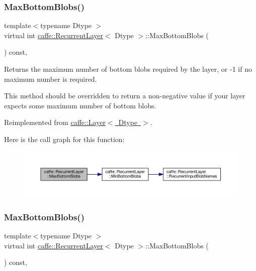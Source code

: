 \subsubsection{\texorpdfstring{Max\+Bottom\+Blobs()}{MaxBottomBlobs()}\hspace{0.1cm}{\footnotesize\ttfamily [1/2]}}
{\footnotesize\ttfamily template$<$typename Dtype $>$ \\
virtual int \mbox{\hyperlink{classcaffe_1_1_recurrent_layer}{caffe\+::\+Recurrent\+Layer}}$<$ Dtype $>$\+::Max\+Bottom\+Blobs (\begin{DoxyParamCaption}{ }\end{DoxyParamCaption}) const\hspace{0.3cm}{\ttfamily [inline]}, {\ttfamily [virtual]}}



Returns the maximum number of bottom blobs required by the layer, or -\/1 if no maximum number is required. 

This method should be overridden to return a non-\/negative value if your layer expects some maximum number of bottom blobs. 

Reimplemented from \mbox{\hyperlink{classcaffe_1_1_layer_af8bdc989053e0363ab032026b46de7c3}{caffe\+::\+Layer$<$ Dtype $>$}}.

Here is the call graph for this function\+:
\nopagebreak
\begin{figure}[H]
\begin{center}
\leavevmode
\includegraphics[width=350pt]{classcaffe_1_1_recurrent_layer_a983e1ead91884f9d2049a3000254961c_cgraph}
\end{center}
\end{figure}
\mbox{\label{classcaffe_1_1_recurrent_layer_a983e1ead91884f9d2049a3000254961c}} 
\subsubsection{\texorpdfstring{Max\+Bottom\+Blobs()}{MaxBottomBlobs()}\hspace{0.1cm}{\footnotesize\ttfamily [2/2]}}
{\footnotesize\ttfamily template$<$typename Dtype $>$ \\
virtual int \mbox{\hyperlink{classcaffe_1_1_recurrent_layer}{caffe\+::\+Recurrent\+Layer}}$<$ Dtype $>$\+::Max\+Bottom\+Blobs (\begin{DoxyParamCaption}{ }\end{DoxyParamCaption}) const\hspace{0.3cm}{\ttfamily [inline]}, {\ttfamily [virtual]}}




